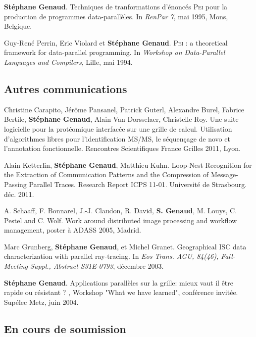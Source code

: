 \documentclass[11pt]{article}
\begin{document}
\begin{thebibliography}{99}
\textbf{Stéphane Genaud}.
\newblock Techniques de tranformations d'énoncés \textsc{Pei} pour la
  production de programmes data-parallèles.
\newblock In {\em RenPar 7}, mai 1995, Mons, Belgique.

Guy-René Perrin, Eric Violard et \textbf{Stéphane Genaud}.
\newblock \textsc{Pei} : a theoretical framework for data-parallel programming.
\newblock In {\em Workshop on Data-Parallel Languages and Compilers}, Lille, 
mai 1994.
\vspace{3mm}


\subsection*{Autres communications}

Christine Carapito, Jérôme Pansanel, Patrick Guterl, Alexandre Burel, Fabrice 
Bertile, \textbf{Stéphane Genaud}, Alain Van Dorsselaer, Christelle Roy.
\newblock Une suite logicielle pour la protéomique interfacée sur une grille de 
calcul. Utilisation d'algorithmes libres pour l'identification MS/MS, le 
séquençage de novo et l'annotation fonctionnelle.
\newblock Rencontres Scientifiques France Grilles 2011, Lyon.


Alain Ketterlin, \textbf{Stéphane Genaud}, Matthieu Kuhn.
\newblock Loop-Nest Recognition for the Extraction of Communication Patterns 
and the Compression of Message-Passing Parallel Traces.
\newblock Research Report ICPS 11-01. Université de Strasbourg. déc. 2011.


A. Schaaff, F. Bonnarel, J.-J. Claudon, R. David, \textbf{S. Genaud}, M. Louys, 
C. Pestel and C. Wolf.
\newblock Work around distributed image processing and workflow management, 
\newblock poster à ADASS 2005, Madrid.


Marc Grunberg, \textbf{Stéphane Genaud}, et Michel Granet.
\newblock Geographical {ISC} data characterization with parallel ray-tracing.
\newblock In {\em Eos Trans. AGU, 84(46), Fall-Meeting Suppl., Abstract
  S31E-0793}, décembre 2003.

\textbf{Stéphane Genaud}.
\newblock Applications parallèles sur la grille: mieux vaut il être rapide ou résistant ? 
, Workshop "What we have learned", conférence invitée.
\newblock Supélec Metz, juin 2004. 

\subsection*{En cours de soumission}


\end{thebibliography}
\end{document}
